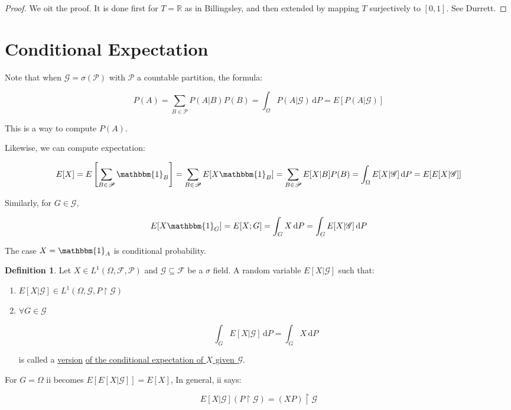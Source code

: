 \documentclass{article}
\theoremstyle{definition}
\newtheorem{definition}{Definition}
\begin{document}
\begin{proof}
    We oit the proof. It is done first for \(T = \mathbb{R}\) as in Billingsley, and then extended by mapping \(T\) surjectively to \([0,1]\). See Durrett.
\end{proof}

\section*{Conditional Expectation}

Note that when \(\mathscr{G} = \sigma (\mathscr{P})\) with \(\mathscr{P} \) a countable partition, the formula:

\[
    P(A) = \sum_{B\in \mathscr{P}} P(A|B)P(B) = \int_{\Omega}^{} P(A|\mathscr{G}) \,\mathrm{d}P = E[P(A|\mathscr{G})]
\]

This is a way to compute \(P(A)\).

Likewise, we can compute expectation:

\[
    E[X] = E\left[\sum_{B\in \mathscr{P}} \mathbbm{1}_{B}\right] = \sum_{B\in \mathscr{P}} E[X \mathbbm{1}_{B}] = \sum_{B\in \mathscr{P}} E[X|B] P(B) = \int_{\Omega}^{} E[X|\mathscr{G}] \,\mathrm{d}P = E[E[X|\mathscr{G}]]
\]

Similarly, for \(G\in \mathscr{G}\),

\[
    E[X \mathbbm{1}_{G}] = E[X;G] = \int_{G}^{} X \,\mathrm{d}P = \int_{G}^{} E[X|\mathscr{G}] \,\mathrm{d}P 
\]

The case \(X = \mathbbm{1}_{A}\) is conditional probability.

\begin{definition}
    Let \(X\in L^1(\Omega ,\mathscr{F} ,\mathscr{P})\) and \(\mathscr{G} \subseteq \mathscr{F}\) be a \(\sigma \) field. A random variable \(E[X|\mathscr{G}]\) such that:

    \begin{enumerate}
        \item \(E[X|\mathscr{G}] \in L^1(\Omega,\mathscr{G},P \upharpoonright \mathscr{G})\) 
        \item \(\forall G\in \mathscr{G} \) 
        
        \[
            \int_{G}^{} E[X|\mathscr{G}] \,\mathrm{d}P = \int_{G}^{} X \,\mathrm{d}P 
        \]

        is called a \underline{version} \underline{of the conditional expectation of \(X\) given \(\mathscr{G}\)}.
    \end{enumerate}

    For \(G = \Omega\) ii becomes \(E[E[X|\mathscr{G}]]=E[X]\), In general, ii says:

    \[
        E[X|\mathscr{G}](P\upharpoonright \mathscr{G}) = (XP)\upharpoonright \mathscr{G}
    \]

\end{definition}
\end{document}
